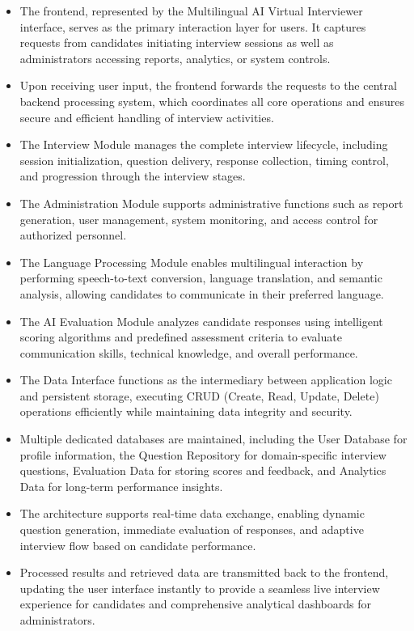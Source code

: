 \documentclass[12pt]{article}
\begin{document}
\begin{itemize}

\item The frontend, represented by the Multilingual AI Virtual Interviewer interface, serves as the primary interaction layer for users. It captures requests from candidates initiating interview sessions as well as administrators accessing reports, analytics, or system controls.

\item Upon receiving user input, the frontend forwards the requests to the central backend processing system, which coordinates all core operations and ensures secure and efficient handling of interview activities.

\item The Interview Module manages the complete interview lifecycle, including session initialization, question delivery, response collection, timing control, and progression through the interview stages.

\item The Administration Module supports administrative functions such as report generation, user management, system monitoring, and access control for authorized personnel.

\item The Language Processing Module enables multilingual interaction by performing speech-to-text conversion, language translation, and semantic analysis, allowing candidates to communicate in their preferred language.

\item The AI Evaluation Module analyzes candidate responses using intelligent scoring algorithms and predefined assessment criteria to evaluate communication skills, technical knowledge, and overall performance.

\item The Data Interface functions as the intermediary between application logic and persistent storage, executing CRUD (Create, Read, Update, Delete) operations efficiently while maintaining data integrity and security.

\item Multiple dedicated databases are maintained, including the User Database for profile information, the Question Repository for domain-specific interview questions, Evaluation Data for storing scores and feedback, and Analytics Data for long-term performance insights.

\item The architecture supports real-time data exchange, enabling dynamic question generation, immediate evaluation of responses, and adaptive interview flow based on candidate performance.

\item Processed results and retrieved data are transmitted back to the frontend, updating the user interface instantly to provide a seamless live interview experience for candidates and comprehensive analytical dashboards for administrators.

\end{itemize}
\end{document}
